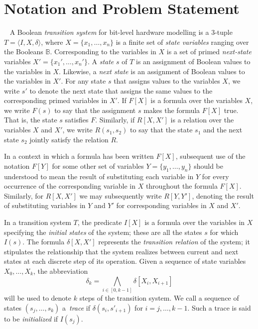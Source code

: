 \section{Notation and Problem Statement}~\label{sec:notation}
%
A Boolean \textit{transition system} for bit-level hardware
modelling is a 3-tuple $T = \langle I,X,\delta \rangle$, where $X = \{x_1,\dots ,x_n\}$
is a finite set of \textit{state variables} ranging over the Booleans $\mathbb{B}$. 
Corresponding to the variables in $X$ is a set of primed \textit{next-state} variables  $X' = \{x_1', \dots, x_n'\}$.
A \textit{state} $s$ of $T$ is an assignment of Boolean values to the variables in $X$. Likewise, a \textit{next state} is an assignment of Boolean values to the variables in $X'$.  For any state $s$ that assigns values to the  variables $X$, we write $s'$ to denote the next state that assigns the same values to the corresponding primed variables in $X'$. If $F[X]$ is a formula over the variables $X$, we write $F(s)$ to say that
the assignment $s$ makes the formula $F[X]$ true. That is, the state $s$ satisfies $F$. Similarly, if $R[X,X']$ is a relation over the variables $X$ and $X'$, we write $R(s_1,s_2)$ to say that the state $s_1$ and the next state $s_2$ jointly satisfy the relation $R$.

In a context in which a formula has been written $F[X]$, subsequent use of the notation $F[Y]$ for
some other set of variables $Y = \{y_1, \dots, y_n\}$ should be understood to mean the
result of substituting each variable in $Y$ for every occurrence of the corresponding variable in $X$ throughout the formula $F[X]$. Similarly, for $R[X,X']$ we may subsequently write $R[Y,Y']$, denoting the result of substituting variables in $Y$ and $Y'$ for corresponding variables in $X$ and $X'$.

In a transition system $T$, the predicate $I[X]$ is a formula over the variables in 
$X$ specifying the \textit{initial states} of the system; these are all the states 
$s$ for which $I(s)$. The formula $\delta[X,X']$ represents the \textit{transition relation} of the system; it stipulates the relationship that the system
realizes between current and next states at each discrete step of its operation.
Given a sequence of state variables $X_0, \dots, X_k$, the abbreviation \[ \delta_k = \underset{i \in [0,k-1]}{\bigwedge} \delta[X_i, X_{i+1}]\] 
will be used to denote $k$ steps of the transition system.
We call a sequence of states $(s_j,\dots,s_k)$ a~\textit{trace}
if $\delta(s_i,s'_{i{+}1})$ for $i=j,\dots,k-1$.  Such a trace is
said to be \textit{initialized} if $I(s_j)$.
  
